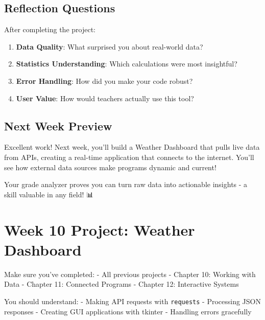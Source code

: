 \documentclass[
  letterpaper,
  DIV=11,
  numbers=noendperiod,
  oneside]{scrreprt}
\providecommand{\tightlist}{%
  \setlength{\itemsep}{0pt}\setlength{\parskip}{0pt}}\usepackage{longtable,booktabs,array}
\begin{document}
\section{Reflection Questions}\label{reflection-questions-8}

After completing the project:

\begin{enumerate}
\def\labelenumi{\arabic{enumi}.}
\tightlist
\item
  \textbf{Data Quality}: What surprised you about real-world data?
\item
  \textbf{Statistics Understanding}: Which calculations were most
  insightful?
\item
  \textbf{Error Handling}: How did you make your code robust?
\item
  \textbf{User Value}: How would teachers actually use this tool?
\end{enumerate}

\section{Next Week Preview}\label{next-week-preview-6}

Excellent work! Next week, you'll build a Weather Dashboard that pulls
live data from APIs, creating a real-time application that connects to
the internet. You'll see how external data sources make programs dynamic
and current!

Your grade analyzer proves you can turn raw data into actionable
insights - a skill valuable in any field! 📊

\chapter{Week 10 Project: Weather
Dashboard}\label{sec-project-weather-app}

\begin{tcolorbox}[enhanced jigsaw, opacityback=0, colback=white, colframe=quarto-callout-important-color-frame, breakable, titlerule=0mm, coltitle=black, rightrule=.15mm, colbacktitle=quarto-callout-important-color!10!white, left=2mm, bottomtitle=1mm, bottomrule=.15mm, title=\textcolor{quarto-callout-important-color}{\faExclamation}\hspace{0.5em}{Before You Start}, opacitybacktitle=0.6, toptitle=1mm, leftrule=.75mm, arc=.35mm, toprule=.15mm]

Make sure you've completed: - All previous projects - Chapter 10:
Working with Data - Chapter 11: Connected Programs - Chapter 12:
Interactive Systems

You should understand: - Making API requests with \texttt{requests} -
Processing JSON responses - Creating GUI applications with tkinter -
Handling errors gracefully

\end{tcolorbox}
\end{document}
